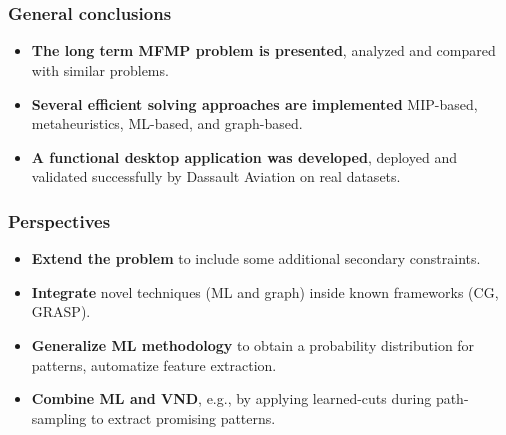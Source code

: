 \section{\conclusiontitle}

\begin{frame}
\frametitle{\textbf{General conclusions}}
    \begin{itemize}[<+->]
    \item \textbf{The long term MFMP problem is presented}, 
      analyzed and compared with similar problems.
    \item \textbf{Several efficient solving approaches are implemented}
      MIP-based, metaheuristics, ML-based, and graph-based.
    \item \textbf{A functional desktop application was developed},
       deployed and validated successfully by Dassault Aviation on real datasets.
    \end{itemize}
\end{frame}

\begin{frame}
\frametitle{\textbf{Perspectives}}
    \begin{itemize}[<+->]
      \item \textbf{Extend the problem} to include some additional secondary constraints.        
      \item \textbf{Integrate} novel techniques (ML and graph) inside known frameworks (CG, GRASP).
      \item \textbf{Generalize ML methodology}
        to obtain a probability distribution for patterns, automatize feature extraction.
      \item \textbf{Combine ML and VND},
        e.g., by applying learned-cuts during path-sampling to extract promising patterns.
    \end{itemize}
\end{frame}

